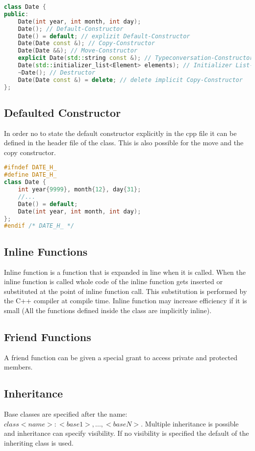 \begin{lstlisting}[language=C++]
class Date {
public:
    Date(int year, int month, int day);
    Date(); // Default-Constructor
    Date() = default; // explizit Default-Constructor
    Date(Date const &); // Copy-Constructor
    Date(Date &&); // Move-Constructor
    explicit Date(std::string const &); // Typeconversation-Constructor
    Date(std::initializer_list<Element> elements); // Initializer List-Constructor
    ~Date(); // Destructor
    Date(Date const &) = delete; // delete implicit Copy-Constructor
};
\end{lstlisting}

\subsection{Defaulted Constructor}
In order no to state the default constructor explicitly in the cpp file it can be defined in the header file of the class. This is also possible for the move and the copy constructor.
\begin{lstlisting}[language=C++]
#ifndef DATE_H_
#define DATE_H_
class Date {
	int year{9999}, month{12}, day{31};
	//...
	Date() = default;
	Date(int year, int month, int day);
};
#endif /* DATE_H_ */
\end{lstlisting}

\subsection{Inline Functions}
Inline function is a function that is expanded in line when it is called. When the inline function is called whole code of the inline function gets inserted or substituted at the point of inline function call. This substitution is performed by the C++ compiler at compile time. Inline function may increase efficiency if it is small (All the functions defined inside the class are implicitly inline).

\subsection{Friend Functions}
A friend function can be given a special grant to access private and protected members.

\subsection{Inheritance}
 Base classes are specified after the name: $class <name> : <base1>, ... , <baseN>$. Multiple inheritance is possible and inheritance can specify visibility. If no visibility is specified the default of the inheriting class is used.

